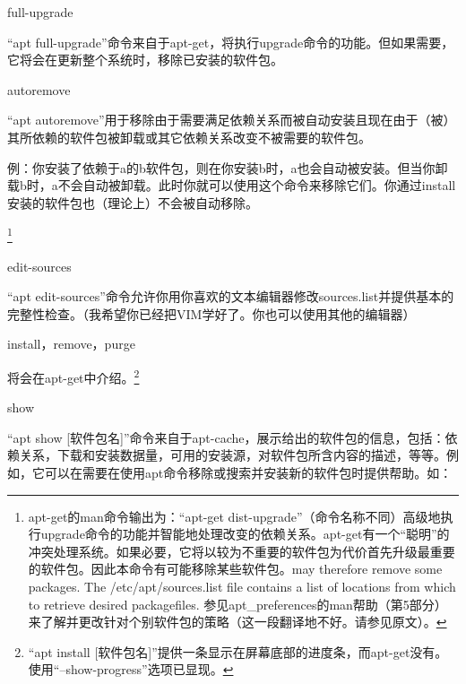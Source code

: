 \documentclass{book}
\begin{document}
\begin{center} full-upgrade \end{center}
“apt full-upgrade”命令来自于apt-get，将执行upgrade命令的功能。但如果需要，它将会在更新整个系统时，移除已安装的软件包。 \par
\begin{center} autoremove \end{center}
{\color{red}{警告！这个命令可能对系统造成不可逆的致命破坏！}}  \par
“apt autoremove”用于移除由于需要满足依赖关系而被自动安装且现在由于（被）其所依赖的软件包被卸载或其它依赖关系改变不被需要的软件包。 \par
例：你安装了依赖于a的b软件包，则在你安装b时，a也会自动被安装。但当你卸载b时，a不会自动被卸载。此时你就可以使用这个命令来移除它们。你通过install安装的软件包也（理论上）不会被自动移除。 \par
\textbf{{\color{red}{你需要检查列出的将被卸载的软件的列表，确保其不包括你需要的软件包（尽管它们有可能作为另一个软件包的依赖而被安装）。你可以通过apt-mark将它们标记为“手动（Manual）”}}}\footnote{apt-get的man命令输出为：“apt-get dist-upgrade”（命令名称不同）高级地执行upgrade命令的功能并智能地处理改变的依赖关系。apt-get有一个“聪明”的冲突处理系统。如果必要，它将以较为不重要的软件包为代价首先升级最重要的软件包。因此本命令有可能移除某些软件包。may therefore remove some packages. The /etc/apt/sources.list file contains a list of locations from which to retrieve desired packagefiles. 参见apt\_preferences的man帮助（第5部分）来了解并更改针对个别软件包的策略（这一段翻译地不好。请参见原文）。} \par
\begin{center} edit-sources \end{center}
“apt edit-sources”命令允许你用你喜欢的文本编辑器修改sources.list并提供基本的完整性检查。（我希望你已经把VIM学好了。你也可以使用其他的编辑器）  \par
\begin{center} install，remove，purge \end{center}
将会在apt-get中介绍。\footnote{“apt install [软件包名]”提供一条显示在屏幕底部的进度条，而apt-get没有。使用“--show-progress”选项已显现。}\par
\begin{center} show \end{center}
“apt show [软件包名]”命令来自于apt-cache，展示给出的软件包的信息，包括：依赖关系，下载和安装数据量，可用的安装源，对软件包所含内容的描述，等等。例如，它可以在需要在使用apt命令移除或搜索并安装新的软件包时提供帮助。如：
\end{document}
